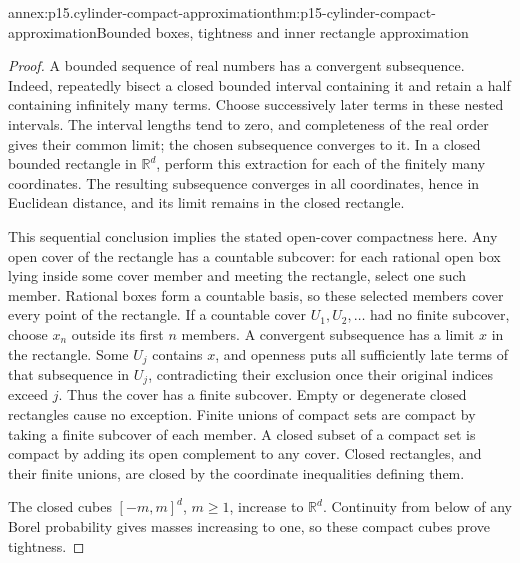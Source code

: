 \begin{annexitem}{annex:p15.cylinder-compact-approximation}{thm:p15-cylinder-compact-approximation}{Bounded boxes, tightness and inner rectangle approximation}
\begin{proof}
A bounded sequence of real numbers has a convergent subsequence.
Indeed, repeatedly bisect a closed bounded interval containing it
and retain a half containing infinitely many terms. Choose successively
later terms in these nested intervals. The interval lengths tend to
zero, and completeness of the real order gives their common limit;
the chosen subsequence converges to it. In a closed bounded rectangle
in \(\mathbb R^d\), perform this extraction for each of the
finitely many coordinates. The resulting subsequence converges in
all coordinates, hence in Euclidean distance, and its limit remains
in the closed rectangle.

This sequential conclusion implies the stated open-cover compactness
here. Any open cover of the rectangle has a countable subcover:
for each rational open box lying inside some cover member and meeting
the rectangle, select one such member. Rational boxes form a countable
basis, so these selected members cover every point of the rectangle.
If a countable cover \(U_1,U_2,\ldots\) had no finite subcover,
choose \(x_n\) outside its first \(n\) members. A convergent
subsequence has a limit \(x\) in the rectangle. Some \(U_j\)
contains \(x\), and openness puts all sufficiently late terms of
that subsequence in \(U_j\), contradicting their exclusion once
their original indices exceed \(j\). Thus the cover has a finite
subcover. Empty or degenerate closed rectangles cause no exception.
Finite unions of compact sets are compact by taking a finite
subcover of each member. A closed subset of a compact set is
compact by adding its open complement to any cover. Closed
rectangles, and their finite unions, are closed by the coordinate
inequalities defining them.

The closed cubes \([-m,m]^d\), \(m\geq1\), increase to
\(\mathbb R^d\). Continuity from below of any Borel probability
gives masses increasing to one, so these compact cubes prove tightness.


\end{proof}
\end{annexitem}
